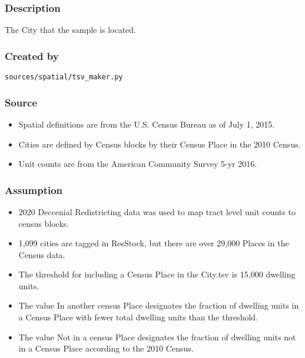 \subsubsection{Description}\label{description-14}

The City that the sample is located.

\subsubsection{Created by}\label{created-by-14}

\texttt{sources/spatial/tsv\_maker.py}

\subsubsection{Source}\label{source-14}

\begin{itemize}
 
\item
  Spatial definitions are from the U.S. Census Bureau as of July 1,
  2015.
\item
  Cities are defined by Census blocks by their Census Place in the 2010
  Census.
\item
  Unit counts are from the American Community Survey 5-yr 2016.
\end{itemize}

\subsubsection{Assumption}\label{assumption-5}

\begin{itemize}
 
\item
  2020 Deccenial Redistricting data was used to map tract level unit
  counts to census blocks.
\item
  1,099 cities are tagged in ResStock, but there are over 29,000 Places
  in the Census data.
\item
  The threshold for including a Census Place in the City.tsv is 15,000
  dwelling units.
\item
  The value \textquotesingle In another census Place\textquotesingle{}
  designates the fraction of dwelling units in a Census Place with fewer
  total dwelling units than the threshold.
\item
  The value \textquotesingle Not in a census Place\textquotesingle{}
  designates the fraction of dwelling units not in a Census Place
  according to the 2010 Census.
\end{itemize}

